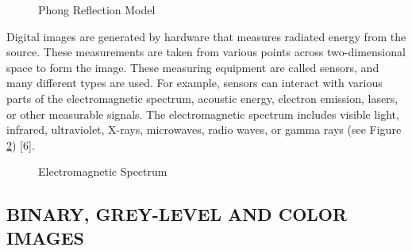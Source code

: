 \begin{figure}[htbp]
\centering
{}
\caption{Phong Reflection Model \cite{kurihara2012shading}}
\label{fig:PhongReflectionModel}
\end{figure}

Digital images are generated by hardware that measures radiated energy from the source. These measurements are taken from various points across two-dimensional space to form the image. These measuring equipment are called sensors, and many different types are used. For example, sensors can interact with various parts of the electromagnetic spectrum, acoustic energy, electron emission, lasers, or other measurable signals. The electromagnetic spectrum includes visible light, infrared, ultraviolet, X-rays, microwaves, radio waves, or gamma rays (see Figure \ref{fig:EMSpectrumcolor}) [6].

\begin{figure}[htbp]
\centering
{}
\caption{Electromagnetic Spectrum \cite{ElectromagneticSpectrum}}
\label{fig:EMSpectrumcolor}
\end{figure}

\subsection{BINARY, GREY-LEVEL AND COLOR IMAGES}

